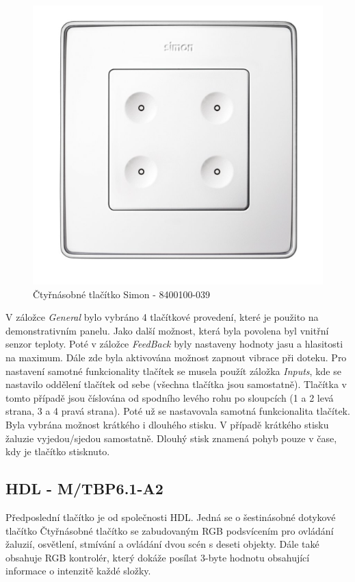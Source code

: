 \begin{figure}[!ht]
  \begin{center}
    \includegraphics[scale=0.4]{obrazky/Simon.png}
  \end{center}
  \caption[Čtyřnásobné tlačítko Simon - 8400100-039 \cite{Simon}]{Čtyřnásobné tlačítko Simon - 8400100-039 \cite{Simon}}
  \label{fig:Čtyřnásobné tlačítko Simon - 8400100-039}
\end{figure}

V záložce \textit{General} bylo vybráno 4 tlačítkové provedení, které je použito na demonstrativním panelu. Jako další možnost, která byla povolena byl vnitřní senzor teploty. Poté v záložce \textit{FeedBack} byly nastaveny hodnoty jasu a hlasitosti na maximum. Dále zde byla aktivována možnost zapnout vibrace při doteku. Pro nastavení samotné funkcionality tlačítek se musela použít záložka \textit{Inputs}, kde se nastavilo oddělení tlačítek od sebe (všechna tlačítka jsou samostatně). Tlačítka v tomto případě jsou číslována od spodního levého rohu po sloupcích (1 a 2 levá strana, 3 a 4 pravá strana). Poté už se nastavovala samotná funkcionalita tlačítek. Byla vybrána možnost krátkého i dlouhého stisku. V případě krátkého stisku žaluzie vyjedou/sjedou samostatně. Dlouhý stisk znamená pohyb pouze v čase, kdy je tlačítko stisknuto.

\subsection{HDL - M/TBP6.1-A2}
Předposlední tlačítko je od společnosti HDL. Jedná se o šestinásobné dotykové tlačítko Čtyřnásobné tlačítko se zabudovaným RGB podsvícením pro ovládání žaluzií, osvětlení, stmívání a ovládání dvou scén s deseti objekty. Dále také obsahuje RGB kontrolér, který dokáže posílat 3-byte hodnotu obsahující informace o intenzitě každé složky. \cite{HDL}

